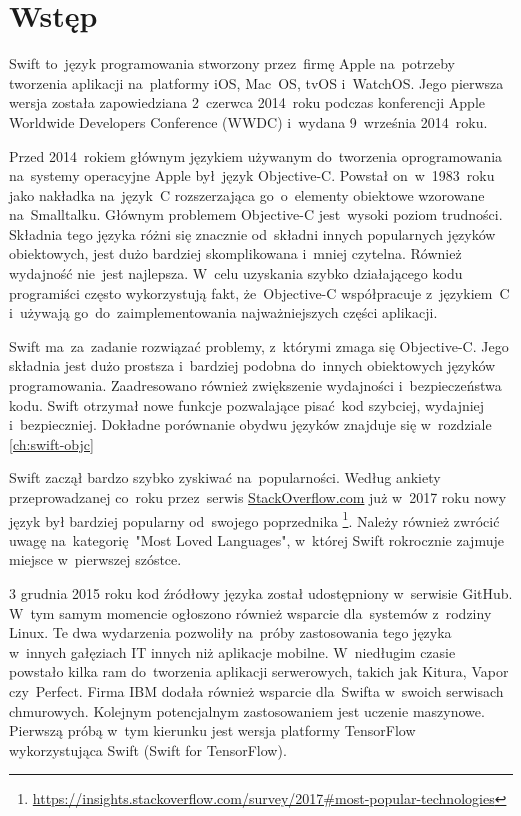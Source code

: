 \documentclass[mgr, shortabstract]{iithesis}
\author         {Maksymilian Debeściak}
\begin{document}

\chapter{Wstęp}
\label{ch:wstep}

Swift to~język programowania stworzony przez~firmę Apple na~potrzeby tworzenia aplikacji na~platformy iOS, Mac~OS, tvOS i~WatchOS. Jego pierwsza wersja została zapowiedziana 2~czerwca 2014~roku podczas konferencji Apple Worldwide Developers Conference (WWDC) i~wydana 9~września 2014~roku.

Przed 2014~rokiem głównym językiem używanym do~tworzenia oprogramowania na~systemy operacyjne Apple był~język Objective-C. Powstał on~w~1983~roku jako nakładka na~język~C rozszerzająca go~o~elementy obiektowe wzorowane na~Smalltalku. Głównym problemem Objective-C jest~wysoki poziom trudności. Składnia tego języka różni się znacznie od~składni innych popularnych języków obiektowych, jest dużo bardziej skomplikowana i~mniej czytelna. Również wydajność nie~jest najlepsza. W~celu uzyskania szybko działającego kodu programiści często wykorzystują fakt, że~Objective-C współpracuje z~językiem~C i~używają go~do~zaimplementowania najważniejszych części aplikacji. 

Swift ma~za~zadanie rozwiązać problemy, z~którymi zmaga się Objective-C. Jego składnia jest dużo prostsza i~bardziej podobna do~innych obiektowych języków programowania. Zaadresowano również zwiększenie wydajności i~bezpieczeństwa kodu. Swift otrzymał nowe funkcje pozwalające pisać kod szybciej, wydajniej i~bezpieczniej. Dokładne porównanie obydwu języków znajduje się w~rozdziale \ref{ch:swift-objc}

Swift zaczął bardzo szybko zyskiwać na~popularności. Według ankiety przeprowadzanej co~roku przez~serwis \url{StackOverflow.com} już w~2017 roku nowy język był bardziej popularny od~swojego poprzednika \footnote{\url{https://insights.stackoverflow.com/survey/2017\#most-popular-technologies}}. Należy również zwrócić uwagę na~kategorię "Most Loved Languages", w~której Swift rokrocznie zajmuje miejsce w~pierwszej szóstce.

3 grudnia 2015 roku kod źródłowy języka został udostępniony w~serwisie GitHub. W~tym samym momencie ogłoszono również wsparcie dla~systemów z~rodziny Linux. Te dwa wydarzenia pozwoliły na~próby zastosowania tego języka w~innych gałęziach IT innych niż aplikacje mobilne. W~niedługim czasie powstało kilka ram do~tworzenia aplikacji serwerowych, takich jak Kitura, Vapor czy~Perfect. Firma IBM dodała również wsparcie dla~Swifta w~swoich serwisach chmurowych. Kolejnym potencjalnym zastosowaniem jest uczenie maszynowe. Pierwszą próbą w~tym kierunku jest wersja platformy TensorFlow wykorzystująca Swift (Swift for TensorFlow).
\end{document}

